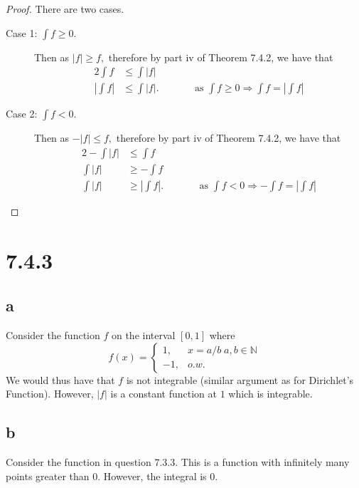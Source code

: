 \documentclass[10pt]{article}
\begin{document}
\begin{proof}
    There are two cases.
    \begin{description}
        \item[Case 1: $\int f \ge 0$.] Then as $|f|\ge f,$ therefore by part iv of Theorem 7.4.2, we have that 
        \begin{alignat*}{2}
            \int f &\le \int |f|\\
            \left |\int f\right | &\le \int |f|. \qquad&&\text{as $\int f\ge 0 \Rightarrow \int f = \left |\int f\right |$}
        \end{alignat*}
        \item[Case 2: $\int f < 0$.] Then as $-|f| \le f,$ therefore by part iv of Theorem 7.4.2, we have that 
        \begin{alignat*}{2}
            -\int |f| &\le \int f\\
            \int |f| &\ge -\int f\\
            \int |f| &\ge \left |\int f\right |.\qquad&&\text{as $\int f< 0 \Rightarrow -\int f = \left |\int f\right |$}
        \end{alignat*}
    \end{description}
\end{proof}

\section*{7.4.3}

\subsection*{a}
Consider the function $f$ on the interval $[0,1]$ where
\begin{equation*}
    f(x)= \begin{cases}
        1, & x=a/b\; a,b\in\mathbb{N}\\
        -1, & o.w.
    \end{cases}
\end{equation*}
We would thus have that $f$ is not integrable (similar argument as for Dirichlet's Function). However, $|f|$ is a constant function at $1$ which is integrable.
\subsection*{b}

Consider the function in question 7.3.3. This is a function with infinitely many points greater than $0$. However, the integral is $0$.
\end{document}
